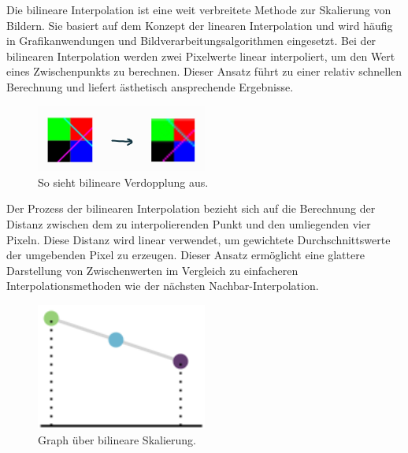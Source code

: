         Die bilineare Interpolation ist eine weit verbreitete Methode zur Skalierung von Bildern.
        Sie basiert auf dem Konzept der linearen Interpolation und wird häufig in Grafikanwendungen und Bildverarbeitungsalgorithmen eingesetzt.
        Bei der bilinearen Interpolation werden zwei Pixelwerte linear interpoliert, um den Wert eines Zwischenpunkts zu berechnen.
        Dieser Ansatz führt zu einer relativ schnellen Berechnung und liefert ästhetisch ansprechende Ergebnisse.

        \begin{figure}[h]
            \centering
            \includegraphics[width=0.5\textwidth]{img/so_sieht_bilineare_verdopplung_aus}
            \caption{So sieht bilineare Verdopplung aus.}
            \label{fig:so_sieht_bilineare_verdopplung_aus}
        \end{figure}

        Der Prozess der bilinearen Interpolation bezieht sich auf die Berechnung der Distanz zwischen dem zu interpolierenden Punkt und den umliegenden vier Pixeln.
        Diese Distanz wird linear verwendet, um gewichtete Durchschnittswerte der umgebenden Pixel zu erzeugen.
        Dieser Ansatz ermöglicht eine glattere Darstellung von Zwischenwerten im Vergleich zu einfacheren Interpolationsmethoden wie der nächsten Nachbar-Interpolation.


        \begin{figure}[h]
            \centering
            \includegraphics[width=0.5\textwidth]{img/pixel_verdopplung_graph.png}
            \caption{Graph über bilineare Skalierung.}
            \label{fig:graph_uber_bilineare_skalierung}
        \end{figure}

